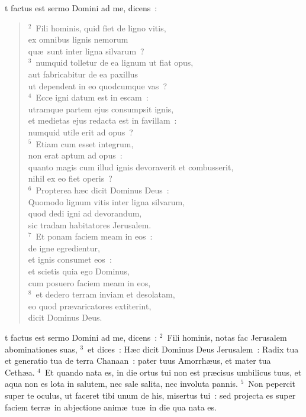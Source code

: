 \bchapter
{}t factus est sermo Domini ad me, dicens~:
\begin{flushleft}\begin{verse}\vspace{6pt}${}^{2}$~Fili hominis, quid fiet de ligno vitis,\\ ex omnibus lignis nemorum\\ qu\ae\ sunt inter ligna silvarum~?\\
${}^{3}$~numquid tolletur de ea lignum ut fiat opus,\\ aut fabricabitur de ea paxillus\\ ut dependeat in eo quodcumque vas~?\\
${}^{4}$~Ecce igni datum est in escam~:\\ utramque partem ejus consumpsit ignis,\\ et medietas ejus redacta est in favillam~:\\ numquid utile erit ad opus~?\\
${}^{5}$~Etiam cum esset integrum,\\ non erat aptum ad opus~:\\ quanto magis cum illud ignis devoraverit et combusserit,\\ nihil ex eo fiet operis~?\\
${}^{6}$~Propterea h\ae c dicit Dominus Deus~:\\ Quomodo lignum vitis inter ligna silvarum,\\ quod dedi igni ad devorandum,\\ sic tradam habitatores Jerusalem.\\
${}^{7}$~Et ponam faciem meam in eos~:\\ de igne egredientur,\\ et ignis consumet eos~:\\ et scietis quia ego Dominus,\\ cum posuero faciem meam in eos,\\
${}^{8}$~et dedero terram inviam et desolatam,\\ eo quod pr\ae varicatores extiterint,\\ dicit Dominus Deus.\end{verse}\end{flushleft}



\bchapter
{}t factus est sermo Domini ad me, dicens~:
${}^{2}$~Fili hominis, notas fac Jerusalem abominationes suas,
${}^{3}$~et dices~: H\ae c dicit Dominus Deus Jerusalem~: Radix tua et generatio tua de terra Chanaan~: pater tuus Amorrh\ae us, et mater tua Ceth\ae a.
${}^{4}$~Et quando nata es, in die ortus tui non est pr\ae cisus umbilicus tuus, et aqua non es lota in salutem, nec sale salita, nec involuta pannis.
${}^{5}$~Non pepercit super te oculus, ut faceret tibi unum de his, misertus tui~: sed projecta es super faciem terr\ae\ in abjectione anim\ae\ tu\ae\ in die qua nata es.


